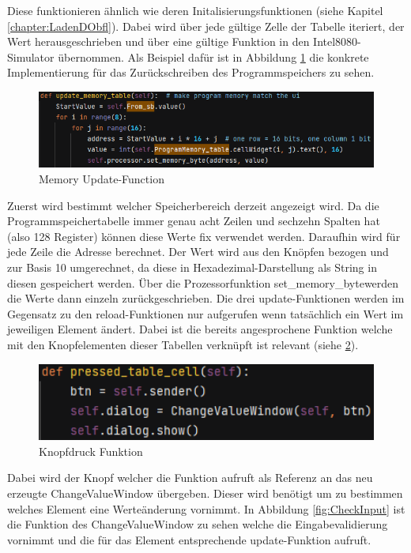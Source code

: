 \documentclass[12pt]{article}
\newcommand{\imgSpaceBefore}{\vspace{10pt}}
\begin{document}
\noindent
Diese funktionieren ähnlich wie deren Initalisierungsfunktionen (siehe Kapitel \ref{chapter:LadenDObfl}). Dabei wird über jede gültige Zelle der Tabelle iteriert, der Wert herausgeschrieben und über eine gültige Funktion in den Intel8080-Simulator übernommen. Als Beispiel dafür ist in Abbildung \ref{fig:MemUpdateFunc} die konkrete Implementierung für das Zurückschreiben des Programmspeichers zu sehen.\imgSpaceBefore

\begin{figure}[H]
\centering
\includegraphics[width=15cm]{bilder/UpdateProgMem}
\caption{Memory Update-Function}
\label{fig:MemUpdateFunc}
\end{figure}

\noindent
Zuerst wird bestimmt welcher Speicherbereich derzeit angezeigt wird. Da die Programmspeichertabelle immer genau acht Zeilen und sechzehn Spalten hat (also 128 Register) können diese Werte fix verwendet werden. Daraufhin wird für jede Zeile die Adresse berechnet. Der Wert wird aus den Knöpfen bezogen und zur Basis 10 umgerechnet, da diese in Hexadezimal-Darstellung als String in diesen gespeichert werden. Über die Prozessorfunktion \glqq set\_memory\_byte\grqq werden die Werte dann einzeln zurückgeschrieben. Die drei \glqq update\grqq-Funktionen werden im Gegensatz zu den \glqq reload\grqq-Funktionen nur aufgerufen wenn tatsächlich ein Wert im jeweiligen Element ändert. Dabei ist die bereits angesprochene Funktion welche mit den Knopfelementen dieser Tabellen verknüpft ist relevant (siehe \ref{fig:PTC}).\imgSpaceBefore

\begin{figure}[H]
\centering
\includegraphics[width=12cm]{bilder/PTC}
\caption{Knopfdruck Funktion}
\label{fig:PTC}
\end{figure}

\noindent
Dabei wird der Knopf welcher die Funktion aufruft als Referenz an das neu erzeugte ChangeValueWindow übergeben. Dieser wird benötigt um zu bestimmen welches Element eine Werteänderung vornimmt. In Abbildung \ref{fig:CheckInput} ist die Funktion des ChangeValueWindow zu sehen welche die Eingabevalidierung vornimmt und die für das Element entsprechende \glqq update\grqq-Funktion aufruft.\imgSpaceBefore
\end{document}
